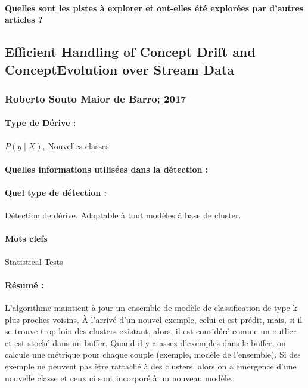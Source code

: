 \documentclass[11pt,a4paper]{report}
\begin{document}
\paragraph{Quelles sont les pistes à explorer et ont-elles  été explorées par d'autres articles ?}








\subsection{Efficient Handling of Concept Drift and ConceptEvolution over Stream Data}
\subsubsection{Roberto Souto Maior de Barro; 2017}

\paragraph{Type de Dérive :} $P(y\mid X)$,  Nouvelles classes
\paragraph{Quelles informations utilisées dans la détection :} 
\paragraph{Quel type de détection :} Détection de dérive. Adaptable à tout modèles à base de cluster.

\paragraph{Mots clefs} Statistical Tests

\paragraph{Résumé :} 
L'algorithme maintient à jour un ensemble de modèle de classification de type k plus proches voisins. 
À l'arrivé d'un nouvel exemple, celui-ci est prédit, mais, si il se trouve trop loin des clusters existant, alors, il est considéré comme un outlier et est stocké dans un buffer. Quand il y a assez d'exemples dans le buffer, on calcule une métrique pour chaque couple (exemple, modèle de l'ensemble). Si des exemple ne peuvent pas être rattaché à des clusters, alors on a emergence d'une nouvelle classe et ceux ci sont incorporé à un nouveau modèle. 
\end{document}
